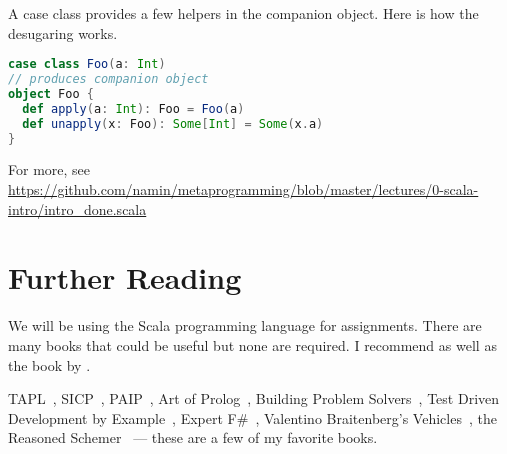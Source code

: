 A case class provides a few helpers in the companion object. Here is
how the desugaring works.
\begin{lstlisting}[language=Scala]
case class Foo(a: Int)
// produces companion object
object Foo {
  def apply(a: Int): Foo = Foo(a)
  def unapply(x: Foo): Some[Int] = Some(x.a)
}
\end{lstlisting}

For more, see \url{https://github.com/namin/metaprogramming/blob/master/lectures/0-scala-intro/intro_done.scala}

\section{Further Reading}

We will be using the Scala programming language for assignments. There
are many books that could be useful but none are required. I recommend
\cite{scala-by-example} as well as the book by
\cite{scala-book-by-odersky}.

TAPL~\citep{tapl}, SICP~\citep{sicp}, PAIP~\citep{paip}, Art of Prolog~\citep{art-prolog},
Building Problem Solvers~\citep{bps}, Test Driven Development by
Example~\citep{tdd}, Expert F\#~\citep{expertfsharp}, Valentino
Braitenberg's Vehicles~\citep{braitenberg1986vehicles}, the Reasoned Schemer~\citep{mk2005,mk} --- these are a few of my favorite books.
